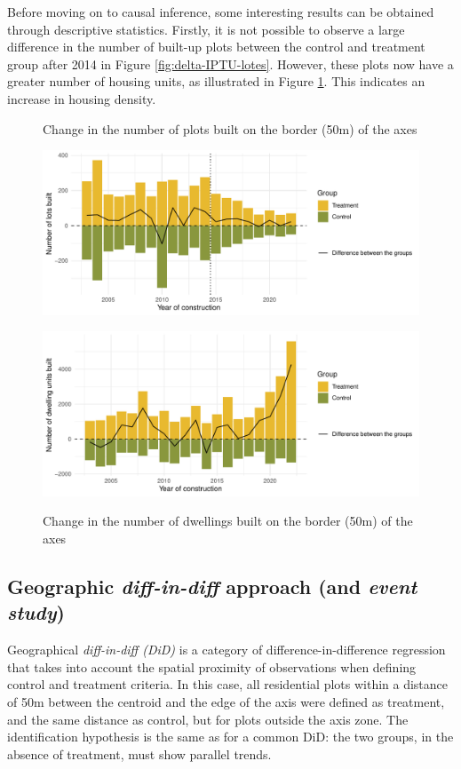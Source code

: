 Before moving on to causal inference, some interesting results can be obtained through descriptive statistics. Firstly, it is not possible to observe a large difference in the number of built-up plots between the control and treatment group after 2014 in Figure \ref{fig:delta-IPTU-lotes}. However, these plots now have a greater number of housing units, as illustrated in Figure \ref{fig:delta-IPTU-unidades}. This indicates an increase in housing density.  

\begin{figure}[h]
    \centering
    \caption{Change in the number of plots built on the border (50m) of the axes}
    \includegraphics[width = .8\textwidth]{figuras/IPTU-delta-lotes.pdf}
    \label{fig:delta-IPTU-lotes}

    \caption{Change in the number of dwellings built on the border (50m) of the axes}
    \includegraphics[width = .8\textwidth]{figuras/IPTU-delta-unidades.pdf}
    \label{fig:delta-IPTU-unidades}
\end{figure}

\subsection{Geographic \textit{diff-in-diff} approach (and \textit{event study})}
\label{subsec:perg2-did}
Geographical \textit{diff-in-diff (DiD)} is a category of difference-in-difference regression that takes into account the spatial proximity of observations when defining control and treatment criteria. In this case, all residential plots within a distance of 50m between the centroid and the edge of the axis were defined as treatment, and the same distance as control, but for plots outside the axis zone. The identification hypothesis is the same as for a common DiD: the two groups, in the absence of treatment, must show parallel trends.

